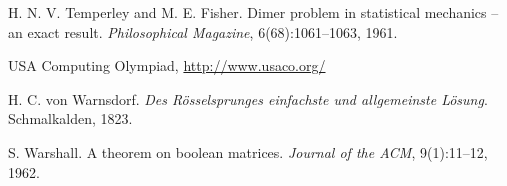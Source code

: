 \begin{thebibliography}{9}
  H. N. V. Temperley and M. E. Fisher.
  Dimer problem in statistical mechanics -- an exact result.
  \emph{Philosophical Magazine}, 6(68):1061--1063, 1961.

  USA Computing Olympiad, \url{http://www.usaco.org/}

  H. C. von Warnsdorf.
  \emph{Des Rösselsprunges einfachste und allgemeinste Lösung}.
  Schmalkalden, 1823.

  S. Warshall.
  A theorem on boolean matrices.
  \emph{Journal of the ACM}, 9(1):11--12, 1962.


\end{thebibliography}
